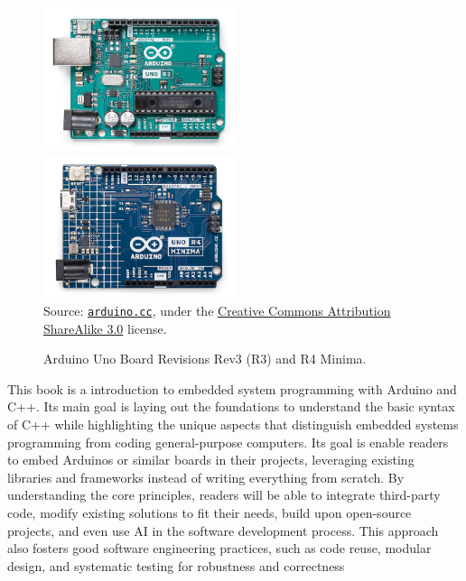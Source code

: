 \begin{figure}[t]
    \includegraphics[width=0.5\textwidth]{img/arduino_uno_rev3}%
    \includegraphics[width=0.5\textwidth]{img/arduino_uno_rev4}%
    \\ \scriptsize
    Source: \href{https://store.arduino.cc/collections/edu-boards}{\texttt{arduino.cc}}, under the \href{https://creativecommons.org/licenses/by-sa/3.0/legalcode}{Creative Commons Attribution ShareAlike 3.0} license.
    \caption{Arduino Uno Board Revisions Rev3 (R3) and R4 Minima.}
    \label{fig:arduino_uno}
\end{figure}

This book is a introduction to embedded system programming with Arduino and C++.
Its main goal is laying out the foundations to understand the basic syntax of C++ while highlighting the unique aspects that distinguish embedded systems programming from coding general-purpose computers.
Its goal is enable readers to embed Arduinos or similar boards in their projects, leveraging existing libraries and frameworks instead of writing everything from scratch.
By understanding the core principles, readers will be able to integrate third-party code, modify existing solutions to fit their needs, build upon open-source projects, and even use AI in the software development process.
This approach also fosters good software engineering practices, such as code reuse, modular design, and systematic testing for robustness and correctness

